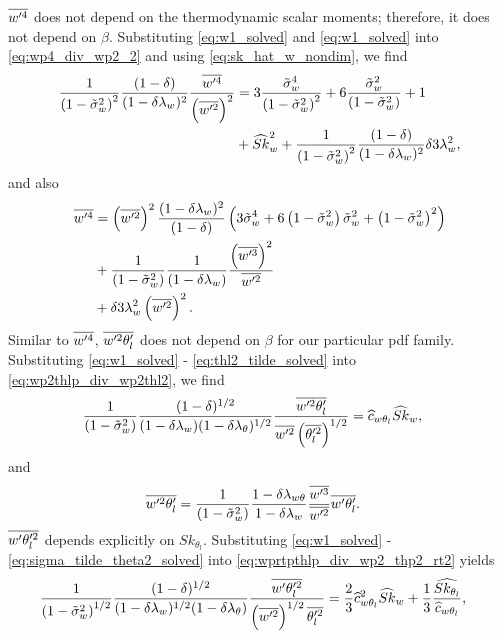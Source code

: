 $\overline{w'^4}$ does not depend on the thermodynamic scalar moments;
therefore, it does not depend on $\beta$.
Substituting \cref{eq:w1_solved} and \cref{eq:w1_solved} into \cref{eq:wp4_div_wp2_2}
and using \cref{eq:sk_hat_w_nondim}, we find
\begin{align}
    \label{eq:wp4_div_wp2_2_solved}
    \frac{1}{\left( 1 - \tilde{\sigma}_w^2 \right)^2} \frac{(1-\delta)}{(1-\delta \lambda_w)^2} \frac{\overline{w'^4}}{\left(\overline{w'^2}\right)^2}
    &= 3 \frac{{\tilde{\sigma}_w}^4}{\left( 1 - \tilde{\sigma}_w^2 \right)^2} + 6 \frac{{\tilde{\sigma}_w}^2}{\left( 1 - \tilde{\sigma}_w^2 \right)} + 1 \nonumber\\
    &+ \widehat{Sk}_w^2 + \frac{1}{\left( 1 - \tilde{\sigma}_w^2 \right)^2} \frac{(1-\delta)}{(1-\delta \lambda_w)^2} \delta 3 \lambda_w^2,
\end{align}
and also
\begin{align}
    \label{eq:wp4}
    \overline{w'^4}
    &= \left(\overline{w'^2}\right)^2
    \frac{(1-\delta \lambda_w)^2}{(1-\delta)}
    \left(3 \tilde{\sigma}_w^4 + 6 \left( 1 - \tilde{\sigma}_w^2 \right) \tilde{\sigma}_w^2 + \left( 1 - \tilde{\sigma}_w^2 \right)^2\right) \nonumber\\
    &+ \frac{1}{\left( 1 - \tilde{\sigma}_w^2 \right)} \frac{1}{(1-\delta \lambda_w)}
    \frac{\left(\overline{w'^3}\right)^2}{\overline{w'^2}} \nonumber\\
    &+ \delta 3 \lambda_w^2 \left(\overline{w'^2}\right)^2.
\end{align}
Similar to $\overline{w'^4}$, $\overline{w'^2 \theta_l'}$ does not depend on $\beta$ for our particular \gls{pdf} family.
Substituting \cref{eq:w1_solved} - \cref{eq:thl2_tilde_solved} into \cref{eq:wp2thlp_div_wp2thl2},
we find
\begin{align}
    \label{eq:wp2thlp_sk_w_solved}
    \frac{1}{\left( 1 - \tilde{\sigma}_w^2 \right)} \frac{(1-\delta)^{1/2}}{(1-\delta \lambda_w) (1-\delta \lambda_\theta)^{1/2}} \frac{\overline{w'^2\theta_l'}}{\overline{w'^2} \left(\overline{\theta_l'^2} \right)^{1/2}}
    &= \widehat{c}_{w\theta_l} \widehat{Sk}_w,
\end{align}
and
\begin{align}
    \label{eq:wp2thlp_solved}
    \overline{w'^2\theta_l'}
    &= \frac{1}{\left( 1 - \tilde{\sigma}_w^2 \right)} \frac{1 - \delta \lambda_{w\theta}}{1-\delta \lambda_w} \frac{\overline{w'^3}}{\overline{w'^2}} \overline{w'\theta_l'}.
\end{align}
$\overline{w' \theta_l'^2}$ depends explicitly on $Sk_{\theta_l}$.
Substituting \cref{eq:w1_solved} - \cref{eq:sigma_tilde_theta2_solved}
into \cref{eq:wprtpthlp_div_wp2_thp2_rt2} yields
\begin{align}
    \label{eq:wpthlp2_sk_w_solved}
    \frac{1}{\left( 1 - \tilde{\sigma}_w^2 \right)^{1/2}} \frac{(1-\delta)^{1/2}}{(1-\delta \lambda_w)^{1/2} (1-\delta \lambda_\theta)} \frac{\overline{w'\theta_l'^2}}{\left(\overline{w'^2}\right)^{1/2} \overline{\theta_l'^2}}
    &= \frac{2}{3} \widehat{c}_{w\theta_l}^2 \widehat{Sk}_w + \frac{1}{3} \frac{ \widehat{Sk_{\theta_l}} } {\widehat{c}_{w\theta_l}},
\end{align}
